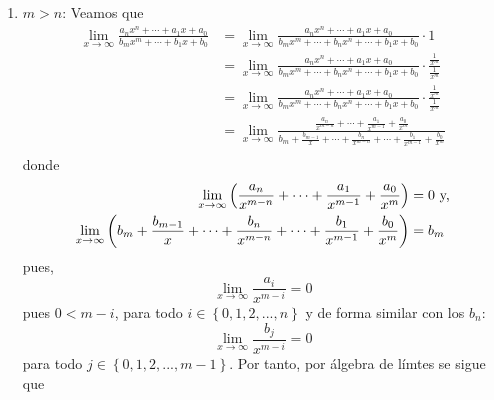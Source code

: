 \documentclass[12pt]{article}
\begin{document}
\begin{enumerate}
\begin{sol}
\begin{enumerate}
            \item $m>n$: Veamos que
            \begin{equation*}
                \begin{split}
                    \lim_{ x\rightarrow\infty}\frac{a_nx^n+\cdots+a_1x+a_0}{b_mx^m+\cdots+b_1x+b_0}&=\lim_{ x\rightarrow\infty}\frac{a_nx^n+\cdots+a_1x+a_0}{b_mx^m+\cdots+b_nx^n+\cdots+b_1x+b_0}\cdot1 \\
                    &=\lim_{ x\rightarrow\infty}\frac{a_nx^n+\cdots+a_1x+a_0}{b_mx^m+\cdots+b_nx^n+\cdots+b_1x+b_0}\cdot\frac{\frac{1}{x^m}}{\frac{1}{x^m}}\\
                    &=\lim_{ x\rightarrow\infty}\frac{a_nx^n+\cdots+a_1x+a_0}{b_mx^m+\cdots+b_nx^n+\cdots+b_1x+b_0}\cdot\frac{\frac{1}{x^m}}{\frac{1}{x^m}}\\
                    &=\lim_{ x\rightarrow\infty}\frac{\frac{a_n}{x^{ m-n}} +\cdots+\frac{a_1}{x^{ m-1}} +\frac{a_0}{x^m}}{b_m+\frac{b_ {m-1}}{x} +\cdots+\frac{b_n}{x^{ m-n}} +\cdots+\frac{b_1}{x^{ m-1}}+\frac{b_0}{x^m}}\\
                \end{split}
            \end{equation*}
            donde
            \begin{equation*}
                \begin{split}
                    \lim_{ x\rightarrow\infty}\left(\frac{a_n}{x^{ m-n}} +\cdots+\frac{a_1}{x^{ m-1}} +\frac{a_0}{x^m}\right)&=0\textup{ y,} \\
                    \lim_{ x\rightarrow\infty}\left(b_m+\frac{b_ {m-1}}{x} +\cdots+\frac{b_n}{x^{ m-n}} +\cdots+\frac{b_1}{x^{ m-1}}+\frac{b_0}{x^m}\right)&=b_m\\
                \end{split}
            \end{equation*}
            pues,
            \begin{equation*}
                \lim_{ x\rightarrow\infty}\frac{a_i}{x^{ m-i}}=0
            \end{equation*}
            pues $0<m-i$, para todo $i\in\left\{0,1,2,...,n\right\}$ y de forma similar con los $b_n$:
            \begin{equation*}
                \lim_{ x\rightarrow\infty}\frac{b_j}{x^{ m-i}}=0
            \end{equation*}
            para todo $j\in\left\{0,1,2,...,m-1\right\}$. Por tanto, por álgebra de límtes se sigue que
            \begin{equation*}

\end{equation*}
\end{enumerate}
\end{sol}
\end{enumerate}
\end{document}
